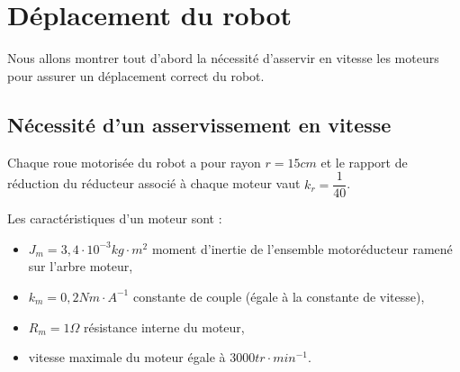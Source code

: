\vspace{-1cm}

\section{Déplacement du robot}

Nous allons montrer tout d'abord la nécessité d'asservir en vitesse les moteurs pour assurer un déplacement correct du robot.

\subsection{Nécessité d'un asservissement en vitesse}

Chaque roue motorisée du robot a pour rayon $r=15cm$ et le rapport de réduction du réducteur associé à chaque moteur vaut $k_r=\dfrac{1}{40}$.

Les caractéristiques d'un moteur sont :
\begin{itemize}
 \item $J_m=3,4\cdot 10^{-3} kg\cdot m^2$ moment d'inertie de l'ensemble motoréducteur ramené sur l'arbre moteur,
 \item $k_m=0,2Nm\cdot A^{-1}$ constante de couple (égale à la constante de vitesse),
 \item $R_m=1\Omega$ résistance interne du moteur,
 \item vitesse maximale du moteur égale à $3000tr\cdot min^{-1}$.
\end{itemize}



